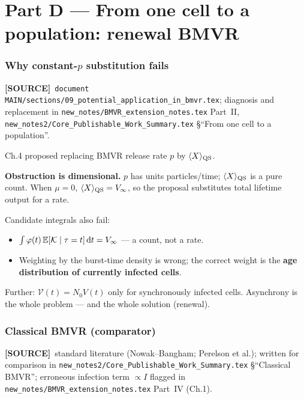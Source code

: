 \documentclass[11pt,a4paper]{article}
\newcommand{\dd}{{\rm d}}
\newcommand{\E}{\mathbb{E}}
\newcommand{\Kb}{\mathcal{K}}
\newcommand{\Vfree}{\mathcal{V}}
\theoremstyle{plain}
\theoremstyle{definition}
\theoremstyle{remark}
\newcommand{\SOURCE}{\textcolor{gray!50!black}{\textbf{[SOURCE]}}}
\begin{document}
\part*{Part D --- From one cell to a population: renewal BMVR}

\section{Why constant-$p$ substitution fails}
\label{sec:why-fail}
\SOURCE\
\texttt{document MAIN/sections/09\_potential\_application\_in\_bmvr.tex};
diagnosis and replacement in
\texttt{new\_notes/BMVR\_extension\_notes.tex} Part~II,
\texttt{new\_notes2/Core\_Publishable\_Work\_Summary.tex}
\S``From one cell to a population''.

Ch.4 proposed replacing BMVR release rate $p$ by $\langle X\rangle_{\rm QS}$.

\begin{framed}
\textbf{Obstruction is dimensional.} $p$ has units particles/time;
$\langle X\rangle_{\rm QS}$ is a pure count. When $\mu=0$,
$\langle X\rangle_{\rm QS}=V_\infty$, so the proposal substitutes total lifetime
output for a rate.

Candidate integrals also fail:
\begin{itemize}
\item $\int\varphi(t)\,\E[\Kb\mid\tau=t]\,\dd t=V_\infty$ --- a count, not a rate.
\item Weighting by the burst-time density is wrong; the correct weight is the
  \textbf{age distribution of currently infected cells}.
\end{itemize}
Further: $\Vfree(t)=N_0 V(t)$ only for synchronously infected cells. Asynchrony
is the whole problem --- and the whole solution (renewal).
\end{framed}

\section{Classical BMVR (comparator)}
\label{sec:classical}
\SOURCE\
standard literature (Nowak--Bangham; Perelson et al.);
written for comparison in
\texttt{new\_notes2/Core\_Publishable\_Work\_Summary.tex}
\S``Classical BMVR'';
erroneous infection term $\propto I$ flagged in
\texttt{new\_notes/BMVR\_extension\_notes.tex} Part~IV (Ch.1).
\end{document}
